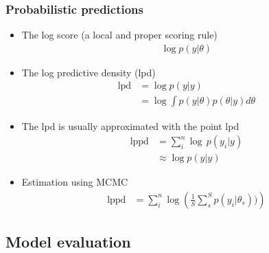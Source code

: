\documentclass[10pt]{beamer}
\begin{document}
\begin{frame}
\frametitle{Probabilistic predictions}

    \begin{itemize}
      \item The log score (a local and proper scoring rule)
      \begin{align*}
         \log p(y|\theta)
      \end{align*}
      \pause
      \item The log predictive density (lpd)
      \begin{align*}
        \text{lpd} & = \log p(y|y)\\
        & = \log \int p(y|\theta) p(\theta|y) d\theta
      \end{align*}
      \pause
      \item The lpd is usually approximated with the point lpd
      \begin{align*}
        \text{lppd} & = \sum_i^n \log \, p(y_i|y)\\
        & \approx \log p(y|y)
      \end{align*}
      \item Estimation using MCMC
      \begin{align*}
        \text{lppd} & = \sum_i^n \log \left(\frac{1}{S} \sum^S_s p(y_i|\theta_{s})) \right)
      \end{align*}
  \end{itemize}

\end{frame}


\subsection{Model evaluation}
\end{document}
